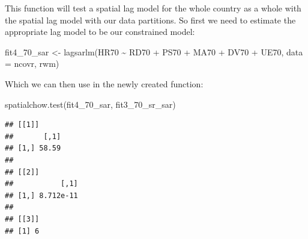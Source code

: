 \documentclass[
  krantz2]{krantz}
\makeatletter
\newenvironment{Shaded}{\begin{snugshade}}{\end{snugshade}}
\newcommand{\AttributeTok}[1]{\textcolor[rgb]{0.61,0.61,0.61}{#1}}
\newcommand{\ConstantTok}[1]{\textcolor[rgb]{0,0,0}{#1}}
\newcommand{\ControlFlowTok}[1]{\textcolor[rgb]{0.27,0.27,0.27}{\textbf{#1}}}
\newcommand{\DecValTok}[1]{\textcolor[rgb]{0.06,0.06,0.06}{#1}}
\newcommand{\FloatTok}[1]{\textcolor[rgb]{0.06,0.06,0.06}{#1}}
\newcommand{\FunctionTok}[1]{\textcolor[rgb]{0,0,0}{#1}}
\newcommand{\NormalTok}[1]{#1}
\newcommand{\OtherTok}[1]{\textcolor[rgb]{0.37,0.37,0.37}{#1}}
\newcommand{\SpecialCharTok}[1]{\textcolor[rgb]{0,0,0}{#1}}
\newenvironment{kframe}{%
\medskip{}
\setlength{\fboxsep}{.8em}
 \def\at@end@of@kframe{}%
 \ifinner\ifhmode%
  \def\at@end@of@kframe{\end{minipage}}%
  \begin{minipage}{\columnwidth}%
 \fi\fi%
 \def\FrameCommand##1{\hskip\@totalleftmargin \hskip-\fboxsep
 \colorbox{shadecolor}{##1}\hskip-\fboxsep
     \hskip-\linewidth \hskip-\@totalleftmargin \hskip\columnwidth}%
 \MakeFramed {\advance\hsize-\width
   \@totalleftmargin\z@ \linewidth\hsize
   \@setminipage}}%
 {\par\unskip\endMakeFramed%
 \at@end@of@kframe}
\renewenvironment{Shaded}{\begin{kframe}}{\end{kframe}}
\makeatother
\begin{document}
\begin{Shaded}
\end{Shaded}

This function will test a spatial lag model for the whole country as a whole with the spatial lag model with our data partitions. So first we need to estimate the appropriate lag model to be our constrained model:

\begin{Shaded}
\begin{Highlighting}[]
\NormalTok{fit4\_70\_sar }\OtherTok{\textless{}{-}} \FunctionTok{lagsarlm}\NormalTok{(HR70 }\SpecialCharTok{\textasciitilde{}}\NormalTok{ RD70 }\SpecialCharTok{+}\NormalTok{ PS70 }\SpecialCharTok{+}\NormalTok{ MA70 }\SpecialCharTok{+}\NormalTok{ DV70 }\SpecialCharTok{+}\NormalTok{ UE70, }\AttributeTok{data =}\NormalTok{ ncovr,}
\NormalTok{                    rwm)}
\end{Highlighting}
\end{Shaded}

Which we can then use in the newly created function:

\begin{Shaded}
\begin{Highlighting}[]
\FunctionTok{spatialchow.test}\NormalTok{(fit4\_70\_sar, fit3\_70\_sr\_sar)}
\end{Highlighting}
\end{Shaded}

\begin{verbatim}
## [[1]]
##       [,1]
## [1,] 58.59
## 
## [[2]]
##           [,1]
## [1,] 8.712e-11
## 
## [[3]]
## [1] 6
\end{verbatim}
\end{document}
